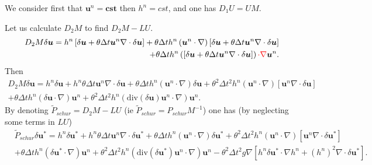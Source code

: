 \documentclass[a4paper, 11pt]{article}
\begin{document}
We consider first that $\boldsymbol{u}^n=\boldsymbol{cst}$ then $h^n=cst$, and one has $D_1U=UM$.

Let us calculate $D_2M$ to find $D_2M-LU$.
\begin{equation*}
\begin{split}
D_2M\delta \boldsymbol{u}=h^n\left[\delta \boldsymbol{u}+\theta\Delta t\boldsymbol{u}^n\nabla\cdot \delta \boldsymbol{u}\right]+\theta\Delta th^n\left(\boldsymbol{u}^n\cdot\nabla\right)\left[\delta \boldsymbol{u}+\theta\Delta t\boldsymbol{u}^n\nabla \cdot \delta \boldsymbol{u}\right]\\
+\theta\Delta th^n\left(\left[\delta \boldsymbol{u}+\theta\Delta t\boldsymbol{u}^n\nabla \cdot \delta \boldsymbol{u}\right]\right)\textcolor{red}{\cdot \nabla }\boldsymbol{u}^n.
\end{split}
\end{equation*}
Then
\begin{equation*}
\begin{split}
D_2M\delta \boldsymbol{u}=h^n\delta \boldsymbol{u}+h^n\theta\Delta t\boldsymbol{u}^n\nabla \cdot \delta \boldsymbol{u}+\theta\Delta th^n\left(\boldsymbol{u}^n\cdot \nabla \right)\delta \boldsymbol{u}+\theta^2\Delta t^2h^n\left(\boldsymbol{u}^n\cdot \nabla \right)\left[\boldsymbol{u}^n\nabla \cdot \delta \boldsymbol{u}\right]\\+\theta\Delta th^n\left(\delta \boldsymbol{u}\cdot \nabla \right)\boldsymbol{u}^n+\theta^2\Delta t^2h^n\left(\text{div}(\delta \boldsymbol{u})\boldsymbol{u}^n\cdot \nabla \right)\boldsymbol{u}^n.
\end{split}
\end{equation*}
By denoting $\tilde{P}_{schur}=D_2M-LU$ (ie $\tilde{P}_{schur}=P_{schur}M^{-1}$) one has (by neglecting some terms in $LU$)
\begin{equation*}
\begin{split}
&\tilde{P}_{schur}\delta \boldsymbol{u}^*=h^n\delta \boldsymbol{u}^*+h^n\theta\Delta t\boldsymbol{u}^n\nabla \cdot \delta \boldsymbol{u}^*+\theta\Delta th^n\left(\boldsymbol{u}^n\cdot \nabla \right)\delta \boldsymbol{u}^*+\theta^2\Delta t^2h^n\left(\boldsymbol{u}^n\cdot \nabla\right)\left[\boldsymbol{u}^n\nabla \cdot \delta \boldsymbol{u}^*\right]\\
&+\theta\Delta th^n\left(\delta \boldsymbol{u}^*\cdot \nabla\right)\boldsymbol{u}^n+\theta^2\Delta t^2h^n\left(\text{div}(\delta \boldsymbol{u}^*)\boldsymbol{u}^n\cdot \nabla\right)\boldsymbol{u}^n-\theta^2\Delta t^2g\nabla\left[h^n\delta \boldsymbol{u}^*\cdot \nabla h^n+(h^n)^2\nabla \cdot \delta \boldsymbol{u}^*\right].
\end{split}
\end{equation*}
\end{document}
